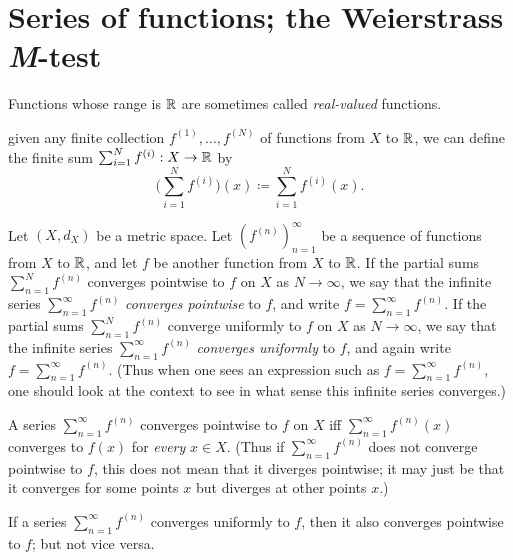 \section{Series of functions; the Weierstrass \emph{M}-test}\label{sec:3.5}

\begin{note}
  Functions whose range is \(\mathbb{R}\) are sometimes called \emph{real-valued} functions.
\end{note}

\begin{note}
  given any finite collection \(f^{(1)}, \dots, f^{(N)}\) of functions from \(X\) to \(\mathbb{R}\), we can define the finite sum \(\sum_{i = 1}^N f^{(i)} : X \to \mathbb{R}\) by
  \[
    \bigg(\sum_{i = 1}^N f^{(i)}\bigg)(x) \coloneqq \sum_{i = 1}^N f^{(i)}(x).
  \]
\end{note}

\setcounter{thm}{1}
\begin{defn}\label{3.5.2}
  Let \((X, d_X)\) be a metric space.
  Let \((f^{(n)})_{n = 1}^\infty\) be a sequence of functions from \(X\) to \(\mathbb{R}\), and let \(f\) be another function from \(X\) to \(\mathbb{R}\).
  If the partial sums \(\sum_{n = 1}^N f^{(n)}\) converges pointwise to \(f\) on \(X\) as \(N \to \infty\), we say that the infinite series \(\sum_{n = 1}^\infty f^{(n)}\) \emph{converges pointwise} to \(f\), and write \(f = \sum_{n = 1}^\infty f^{(n)}\).
  If the partial sums \(\sum_{n = 1}^N f^{(n)}\) converge uniformly to \(f\) on \(X\) as \(N \to \infty\), we say that the infinite series \(\sum_{n = 1}^\infty f^{(n)}\) \emph{converges uniformly} to \(f\), and again write \(f = \sum_{n = 1}^\infty f^{(n)}\).
  (Thus when one sees an expression such as \(f = \sum_{n = 1}^\infty f^{(n)}\), one should look at the context to see in what sense this infinite series converges.)
\end{defn}

\begin{rmk}\label{3.5.3}
  A series \(\sum_{n = 1}^\infty f^{(n)}\) converges pointwise to \(f\) on \(X\) iff \(\sum_{n = 1}^\infty f^{(n)}(x)\) converges to \(f(x)\) for \emph{every} \(x \in X\).
  (Thus if \(\sum_{n = 1}^\infty f^{(n)}\) does not converge pointwise to \(f\), this does not mean that it diverges pointwise;
  it may just be that it converges for some points \(x\) but diverges at other points \(x\).)
\end{rmk}

\begin{note}
  If a series \(\sum_{n = 1}^\infty f^{(n)}\) converges uniformly to \(f\), then it also converges pointwise to \(f\);
  but not vice versa.
\end{note}

